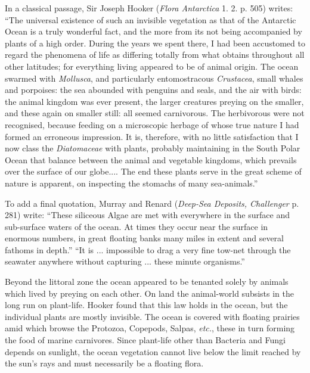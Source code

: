 \documentclass[a4paper, 12pt, oneside]{article}
\begin{document}
In a classical passage, Sir Joseph Hooker (\emph{Flora Antarctica} 1. 2. p. 505) writes: ``The universal existence of such an invisible vegetation as that of the Antarctic Ocean is a truly wonderful fact, and the more from its not being accompanied by plants of a high order. During the years we spent there, I had been accustomed to regard the phenomena of life as differing totally from what obtains throughout all other latitudes; for everything living appeared to be of animal origin. The ocean swarmed with \emph{Mollusca}, and particularly entomostracous \emph{Crustacea}, small whales and porpoises: the sea abounded with penguins and seals, and the air with birds: the animal kingdom was ever present, the larger creatures preying on the smaller, and these again on smaller still: all seemed carnivorous. The herbivorous were not recognised, because feeding on a microscopic herbage of whose true nature I had formed an erroneous impression. It is, therefore, with no little satisfaction that I now class the \emph{Diatomaceae} with plants, probably maintaining in the South Polar Ocean that balance between the animal and vegetable kingdoms, which prevails over the surface of our globe.... The end these plants serve in the great scheme of nature is apparent, on inspecting the stomachs of many sea-animals.''

To add a final quotation, Murray and Renard (\emph{Deep-Sea Deposits, Challenger} p. 281) write: ``These siliceous Algae are met with everywhere in the surface and sub-surface waters of the ocean. At times they occur near the surface in enormous numbers, in great floating banks many miles in extent and several fathoms in depth.'' ``It is ... impossible to drag a very fine tow-net through the seawater anywhere without capturing ... these minute organisms.'' 

Beyond the littoral zone the ocean appeared to be tenanted solely by animals which lived by preying on each other. On land the animal-world subsists in the long run on plant-life. Hooker found that this law holds in the ocean, but the individual plants are mostly invisible. The ocean is covered with floating prairies amid which browse the Protozoa, Copepods, Salpas, \emph{etc.}, these in turn forming the food of marine carnivores. Since plant-life other than Bacteria and Fungi depends on sunlight, the ocean vegetation cannot live below the limit reached by the sun's rays and must necessarily be a floating flora. 
\end{document}
